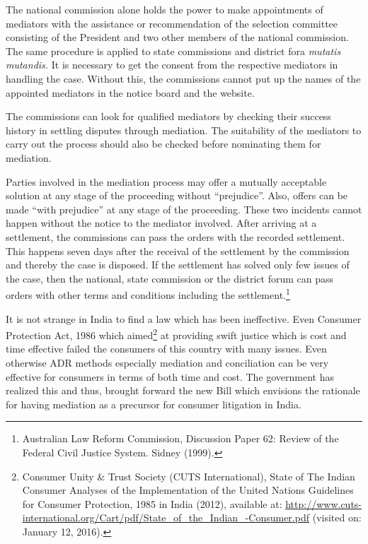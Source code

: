 \begin{multicols}{2}
\noi
The national commission alone holds the power to make appointments of mediators with the
assistance or recommendation of the selection committee consisting of the President and two
other members of the national commission. The same procedure is applied to state commissions
and district fora \textit{mutatis mutandis.} It is necessary to get the consent from the respective
mediators in handling the case. Without this, the commissions cannot put up the names of the
appointed mediators in the notice board and the website.

\noi
The commissions can look for qualified mediators by checking their success history in settling
disputes through mediation. The suitability of the mediators to carry out the process should
also be checked before nominating them for mediation.

\noi
Parties involved in the mediation process may offer a mutually acceptable solution at any stage
of the proceeding without “prejudice”. Also, offers can be made “with prejudice” at any stage of the proceeding. These two incidents cannot happen without the notice to the mediator
involved. After arriving at a settlement, the commissions can pass the orders with the recorded
settlement. This happens seven days after the receival of the settlement by the commission and
thereby the case is disposed. If the settlement has solved only few issues of the case, then the
national, state commission or the district forum can pass orders with other terms and conditions
including the settlement.\footnote{Australian Law Reform Commission, Discussion Paper 62: Review of the Federal Civil Justice System. Sidney (1999).}


\noi
It is not strange in India to find a law which has been ineffective. Even Consumer Protection
Act, 1986 which aimed\footnote{Consumer Unity \& Trust Society (CUTS International), State of The Indian Consumer Analyses of the Implementation of the United Nations Guidelines for Consumer Protection, 1985 in India (2012), available at: \url{http://www.cuts-international.org/Cart/pdf/State_of_the_Indian_-Consumer.pdf} (visited on: January 12, 2016).} at providing swift justice which is cost and time effective failed the
consumers of this country with many issues. Even otherwise ADR methods especially
mediation and conciliation can be very effective for consumers in terms of both time and cost.
The government has realized this and thus, brought forward the new Bill which envisions the
rationale for having mediation as a precursor for consumer litigation in India.
\end{multicols}
	
\label{end2017-art5}
